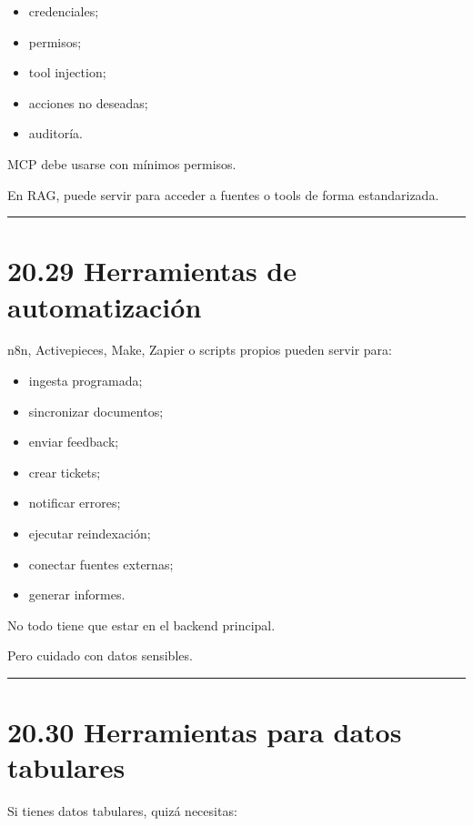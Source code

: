 \begin{itemize}
\tightlist
\item
  credenciales;
\item
  permisos;
\item
  tool injection;
\item
  acciones no deseadas;
\item
  auditoría.
\end{itemize}

MCP debe usarse con mínimos permisos.

En RAG, puede servir para acceder a fuentes o tools de forma
estandarizada.

\begin{center}\rule{0.5\linewidth}{0.5pt}\end{center}

\section{20.29 Herramientas de
automatización}\label{herramientas-de-automatizaciuxf3n}

n8n, Activepieces, Make, Zapier o scripts propios pueden servir para:

\begin{itemize}
\tightlist
\item
  ingesta programada;
\item
  sincronizar documentos;
\item
  enviar feedback;
\item
  crear tickets;
\item
  notificar errores;
\item
  ejecutar reindexación;
\item
  conectar fuentes externas;
\item
  generar informes.
\end{itemize}

No todo tiene que estar en el backend principal.

Pero cuidado con datos sensibles.

\begin{center}\rule{0.5\linewidth}{0.5pt}\end{center}

\section{20.30 Herramientas para datos
tabulares}\label{herramientas-para-datos-tabulares}

Si tienes datos tabulares, quizá necesitas:

